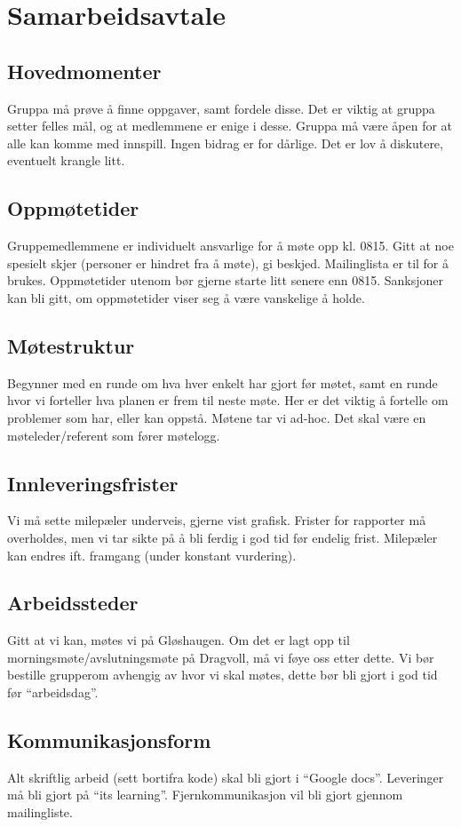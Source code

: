 \appendix
{}
\section{Samarbeidsavtale} \label{A} 
\subsection{Hovedmomenter}
Gruppa må prøve å finne oppgaver, samt fordele disse. Det er viktig at gruppa setter felles mål, og at medlemmene er enige i desse. Gruppa må være åpen for at alle kan komme med innspill. Ingen bidrag er for dårlige. Det er lov å diskutere, eventuelt krangle litt.
\subsection{Oppmøtetider}
Gruppemedlemmene er individuelt ansvarlige for å møte opp kl. 0815. Gitt at noe spesielt skjer (personer er hindret fra å møte), gi beskjed. Mailinglista er til for å brukes. Oppmøtetider utenom bør gjerne starte litt senere enn 0815. Sanksjoner kan bli gitt, om oppmøtetider viser seg å være vanskelige å holde.
\subsection{Møtestruktur}
Begynner med en runde om hva hver enkelt har gjort før møtet, samt en runde hvor vi forteller hva planen er frem til neste møte. Her er det viktig å fortelle om problemer som har, eller kan oppstå. Møtene tar vi ad-hoc. Det skal være en møteleder/referent som fører møtelogg.
\subsection{Innleveringsfrister}
Vi må sette milepæler underveis, gjerne vist grafisk. Frister for rapporter må overholdes, men vi tar sikte på å bli ferdig i god tid før endelig frist. Milepæler kan endres ift. framgang (under konstant vurdering).
\subsection{Arbeidssteder}
Gitt at vi kan, møtes vi på Gløshaugen. Om det er lagt opp til morningsmøte/avslutningsmøte på Dragvoll, må vi føye oss etter dette. Vi bør bestille grupperom avhengig av hvor vi skal møtes, dette bør bli gjort i god tid før “arbeidsdag”.
\subsection{Kommunikasjonsform}
Alt skriftlig arbeid (sett bortifra kode) skal bli gjort i “Google docs”. Leveringer må bli gjort på “its learning”. Fjernkommunikasjon vil bli gjort gjennom mailingliste.
